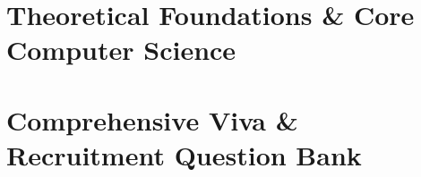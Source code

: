 \documentclass[12pt,a4paper]{book}
\begin{document}
\part{Theoretical Foundations \& Core Computer Science}
\label{part:foundations}























\part{Comprehensive Viva \& Recruitment Question Bank}
\label{part:viva}







\backmatter
\end{document}

